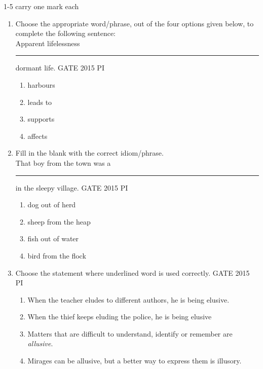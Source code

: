 \documentclass[journal,12pt,onecolumn]{IEEEtran}
\theoremstyle{remark}
\begin{document}
1-5 carry one mark each
\begin{enumerate}
    \item Choose the appropriate word/phrase, out of the four options given below, to complete the following sentence:\\
Apparent lifelessness \rule{2cm}{0.15mm} dormant life.
\hfill{GATE 2015 PI}

\begin{multicols}{2}
\begin{enumerate}
    \item harbours
    \item leads to
    \item supports
    \item affects
\end{enumerate}
\end{multicols}

\item Fill in the blank with the correct idiom/phrase.\\
That boy from the town was a \rule{2cm}{0.15mm} in the sleepy village.
\hfill{GATE 2015 PI}

\begin{multicols}{2}
\begin{enumerate}
    \item dog out of herd
    \item sheep from the heap
    \item fish out of water
    \item bird from the flock
\end{enumerate}
\end{multicols}
\item Choose the statement where underlined word is used correctly.
\hfill{GATE 2015 PI}

\begin{multicols}{2}
\begin{enumerate}
    \item When the teacher eludes to different authors, he is being elusive.
    \item When the thief keeps eluding the police, he is being elusive
    \item Matters that are difficult to understand, identify or remember are \textit{allusive}.
    \item Mirages can be allusive, but a better way to express them is illusory.
\end{enumerate}
\end{multicols}


\end{enumerate}
\end{document}
